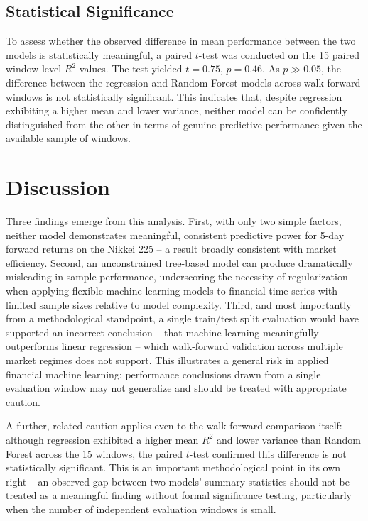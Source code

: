 \documentclass[11pt]{article}
\begin{document}
\subsection{Statistical Significance}

To assess whether the observed difference in mean performance between the two models is statistically meaningful, a paired $t$-test was conducted on the 15 paired window-level $R^2$ values. The test yielded $t = 0.75$, $p = 0.46$. As $p \gg 0.05$, the difference between the regression and Random Forest models across walk-forward windows is not statistically significant. This indicates that, despite regression exhibiting a higher mean and lower variance, neither model can be confidently distinguished from the other in terms of genuine predictive performance given the available sample of windows.

\section{Discussion}

Three findings emerge from this analysis. First, with only two simple factors, neither model demonstrates meaningful, consistent predictive power for 5-day forward returns on the Nikkei 225 -- a result broadly consistent with market efficiency. Second, an unconstrained tree-based model can produce dramatically misleading in-sample performance, underscoring the necessity of regularization when applying flexible machine learning models to financial time series with limited sample sizes relative to model complexity. Third, and most importantly from a methodological standpoint, a single train/test split evaluation would have supported an incorrect conclusion -- that machine learning meaningfully outperforms linear regression -- which walk-forward validation across multiple market regimes does not support. This illustrates a general risk in applied financial machine learning: performance conclusions drawn from a single evaluation window may not generalize and should be treated with appropriate caution.

A further, related caution applies even to the walk-forward comparison itself: although regression exhibited a higher mean $R^2$ and lower variance than Random Forest across the 15 windows, the paired $t$-test confirmed this difference is not statistically significant. This is an important methodological point in its own right -- an observed gap between two models' summary statistics should not be treated as a meaningful finding without formal significance testing, particularly when the number of independent evaluation windows is small.
\end{document}
